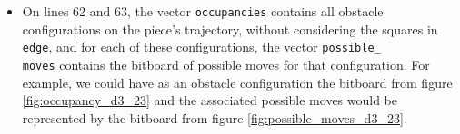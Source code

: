 \documentclass[12pt,a4paper,twoside,openright]{book}
\begin{document}
\begin{itemize}
\begin{itemize}
\begin{itemize}
\item On lines 62 and 63, the vector \texttt{occupancies} contains all obstacle configurations on the piece's trajectory, without considering the squares in \texttt{edge}, and for each of these configurations, the vector \texttt{possible_}\\\texttt{moves} contains the bitboard of possible moves for that configuration. For example, we could have as an obstacle configuration the bitboard from figure \ref{fig:occupancy_d3_23} and the associated possible moves would be represented by the bitboard from figure \ref{fig:possible_moves_d3_23}.


\end{itemize}
\end{itemize}
\end{itemize}
\end{document}
